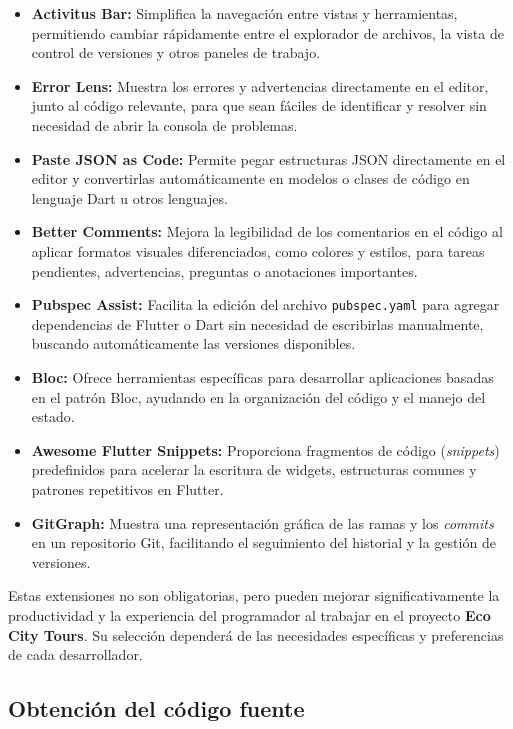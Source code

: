 \begin{itemize} \item \textbf{Activitus Bar:} Simplifica la navegación entre vistas y herramientas, permitiendo cambiar rápidamente entre el explorador de archivos, la vista de control de versiones y otros paneles de trabajo. \item \textbf{Error Lens:} Muestra los errores y advertencias directamente en el editor, junto al código relevante, para que sean fáciles de identificar y resolver sin necesidad de abrir la consola de problemas. \item \textbf{Paste JSON as Code:} Permite pegar estructuras JSON directamente en el editor y convertirlas automáticamente en modelos o clases de código en lenguaje Dart u otros lenguajes. \item \textbf{Better Comments:} Mejora la legibilidad de los comentarios en el código al aplicar formatos visuales diferenciados, como colores y estilos, para tareas pendientes, advertencias, preguntas o anotaciones importantes. \item \textbf{Pubspec Assist:} Facilita la edición del archivo \texttt{pubspec.yaml} para agregar dependencias de Flutter o Dart sin necesidad de escribirlas manualmente, buscando automáticamente las versiones disponibles. \item \textbf{Bloc:} Ofrece herramientas específicas para desarrollar aplicaciones basadas en el patrón Bloc, ayudando en la organización del código y el manejo del estado. \item \textbf{Awesome Flutter Snippets:} Proporciona fragmentos de código (\textit{snippets}) predefinidos para acelerar la escritura de widgets, estructuras comunes y patrones repetitivos en Flutter. \item \textbf{GitGraph:} Muestra una representación gráfica de las ramas y los \textit{commits} en un repositorio Git, facilitando el seguimiento del historial y la gestión de versiones. \end{itemize}

Estas extensiones no son obligatorias, pero pueden mejorar significativamente la productividad y la experiencia del programador al trabajar en el proyecto \textbf{Eco City Tours}. Su selección dependerá de las necesidades específicas y preferencias de cada desarrollador.

\subsection{Obtención del código fuente}

